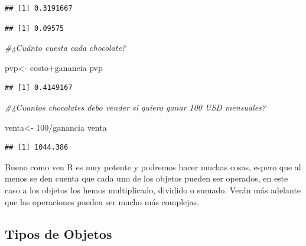 \documentclass[]{article}
\newenvironment{Shaded}{\begin{snugshade}}{\end{snugshade}}
\newcommand{\DecValTok}[1]{\textcolor[rgb]{0.00,0.00,0.81}{{#1}}}
\newcommand{\FloatTok}[1]{\textcolor[rgb]{0.00,0.00,0.81}{{#1}}}
\newcommand{\StringTok}[1]{\textcolor[rgb]{0.31,0.60,0.02}{{#1}}}
\newcommand{\CommentTok}[1]{\textcolor[rgb]{0.56,0.35,0.01}{\textit{{#1}}}}
\newcommand{\NormalTok}[1]{{#1}}
\begin{document}
\begin{verbatim}
## [1] 0.3191667
\end{verbatim}

\begin{Shaded}
\end{Shaded}

\begin{verbatim}
## [1] 0.09575
\end{verbatim}

\begin{Shaded}
\begin{Highlighting}[]
\CommentTok{#¿Cuánto cuesta cada chocolate?}

\NormalTok{pvp<-}\StringTok{ }\NormalTok{costo+ganancia}
\NormalTok{pvp}
\end{Highlighting}
\end{Shaded}

\begin{verbatim}
## [1] 0.4149167
\end{verbatim}

\begin{Shaded}
\begin{Highlighting}[]
\CommentTok{#¿Cuantos chocolates debo vender si quiero ganar 100 USD mensuales?}

\NormalTok{venta<-}\StringTok{ }\DecValTok{100}\NormalTok{/ganancia}
\NormalTok{venta}
\end{Highlighting}
\end{Shaded}

\begin{verbatim}
## [1] 1044.386
\end{verbatim}

Bueno como ven R es muy potente y podremos hacer muchas cosas, espero
que al menos se den cuenta que cada uno de los objetos pueden ser
operados, en este caso a los objetos los hemos multiplicado, dividido o
sumado. Verán más adelante que las operaciones pueden ser mucho más
complejas.

\subsection{Tipos de Objetos}\label{tipos-de-objetos}
\end{document}
